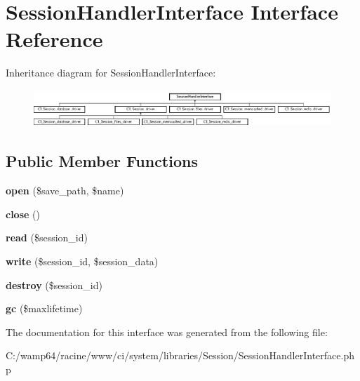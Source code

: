 \hypertarget{interface_session_handler_interface}{}\section{Session\+Handler\+Interface Interface Reference}
\label{interface_session_handler_interface}
Inheritance diagram for Session\+Handler\+Interface\+:\begin{figure}[H]
\begin{center}
\leavevmode
\includegraphics[height=1.414141cm]{interface_session_handler_interface}
\end{center}
\end{figure}
\subsection*{Public Member Functions}
\begin{DoxyCompactItemize}
\item 
\mbox{\label{interface_session_handler_interface_afa0050098bed3076b5e12a67fbd0662f}} 
{\bfseries open} (\$save\+\_\+path, \$name)
\item 
\mbox{\label{interface_session_handler_interface_a0d82d3c485c2fdfd5de29eea5beb8ea8}} 
{\bfseries close} ()
\item 
\mbox{\label{interface_session_handler_interface_a653a933f839a5903b9c7ef3caba55112}} 
{\bfseries read} (\$session\+\_\+id)
\item 
\mbox{\label{interface_session_handler_interface_ad9d61fe48eefebdb0cd7417c6b0493bc}} 
{\bfseries write} (\$session\+\_\+id, \$session\+\_\+data)
\item 
\mbox{\label{interface_session_handler_interface_ae4655c1bc16211a85db3acb7d6697131}} 
{\bfseries destroy} (\$session\+\_\+id)
\item 
\mbox{\label{interface_session_handler_interface_a30958b534e8e9ed6ec4625346fb2ee8e}} 
{\bfseries gc} (\$maxlifetime)
\end{DoxyCompactItemize}


The documentation for this interface was generated from the following file\+:\begin{DoxyCompactItemize}
\item 
C\+:/wamp64/racine/www/ci/system/libraries/\+Session/Session\+Handler\+Interface.\+php\end{DoxyCompactItemize}
